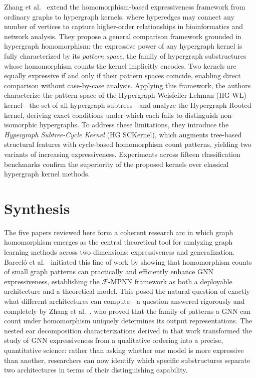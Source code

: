 \documentclass[12pt]{article}
\begin{document}
Zhang et al.~\cite{zhang2026reinterpreting} extend the homomorphism-based expressiveness
framework from ordinary graphs to hypergraph kernels, where hyperedges may
connect any number of vertices to capture higher-order relationships in
bioinformatics and network analysis. They propose a general comparison framework
grounded in hypergraph homomorphism: the expressive power of any hypergraph
kernel is fully characterized by its \textit{pattern space}, the family of
hypergraph substructures whose homomorphism counts the kernel implicitly encodes.
Two kernels are equally expressive if and only if their pattern spaces coincide,
enabling direct comparison without case-by-case analysis. Applying this
framework, the authors characterize the pattern space of the Hypergraph
Weisfeiler-Lehman (HG WL) kernel---the set of all hypergraph subtrees---and
analyze the Hypergraph Rooted kernel, deriving exact conditions under which each
fails to distinguish non-isomorphic hypergraphs. To address these limitations,
they introduce the \textit{Hypergraph Subtree-Cycle Kernel} (HG SCKernel), which
augments tree-based structural features with cycle-based homomorphism count
patterns, yielding two variants of increasing expressiveness. Experiments across
fifteen classification benchmarks confirm the superiority of the proposed kernels
over classical hypergraph kernel methods.

\section{Synthesis}

The five papers reviewed here form a coherent research arc in which graph
homomorphism emerges as the central theoretical tool for analyzing graph learning
methods across two dimensions: expressiveness and generalization.
Barcel\'{o} et al.~\cite{barcelo2021graph} initiated this line of work by showing that homomorphism
counts of small graph patterns can practically and efficiently enhance GNN
expressiveness, establishing the $\mathcal{F}$-MPNN framework as both a
deployable architecture and a theoretical model. This posed the natural question
of exactly what different architectures can compute---a question answered
rigorously and completely by Zhang et al.~\cite{zhang2024beyond}, who proved that the family
of patterns a GNN can count under homomorphism uniquely determines its output
representations. The nested ear decomposition characterizations derived in that
work transformed the study of GNN expressiveness from a qualitative ordering into
a precise, quantitative science: rather than asking whether one model is more
expressive than another, researchers can now identify which specific substructures
separate two architectures in terms of their distinguishing capability.
\end{document}
